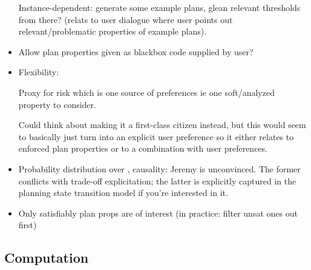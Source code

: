 \begin{itemize}
  Instance-dependent: generate some example plans, glean relevant
  thresholds from there? (relats to user dialogue where user points
  out relevant/problematic properties of example plans).

\item Allow plan properties given as blackbox code supplied by user?

\item Flexibility: 

  Proxy for risk which is one source of preferences ie one
  soft/analyzed property to consider.

  Could think about making it a first-class citizen instead, but this
  would seem to basically just turn into an explicit user preference
  so it either relates to enforced plan properties or to a combination
  with user preferences.

\item Probability distribution over \plans, causality: Jeremy is
  unconvinced. The former conflicts with trade-off explicitation; the
  latter is explicitly captured in the planning state transition model
  if you're interested in it.

\item Only satisfiably plan props are of interest (in practice: filter
  unsat ones out first)

\end{itemize}




\subsection{Computation}

